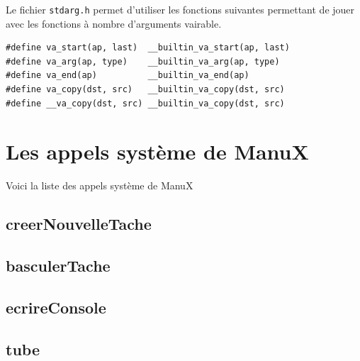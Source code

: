    Le fichier \lstinline!stdarg.h! permet d'utiliser les fonctions
suivantes permettant de jouer avec les fonctions à nombre d'arguments
vairable.

\begin{lstlisting}
#define va_start(ap, last)  __builtin_va_start(ap, last)
#define va_arg(ap, type)    __builtin_va_arg(ap, type)
#define va_end(ap)          __builtin_va_end(ap)
#define va_copy(dst, src)   __builtin_va_copy(dst, src)
#define __va_copy(dst, src) __builtin_va_copy(dst, src)
\end{lstlisting}

%
\section{Les appels système de ManuX}

   Voici la liste des appels système de ManuX

%
\subsection{creerNouvelleTache}

%
\subsection{basculerTache}

%
\subsection{ecrireConsole}

%
\subsection{tube}


